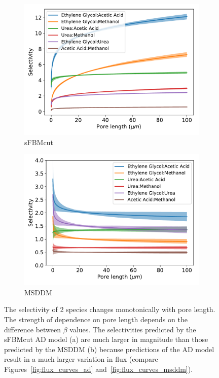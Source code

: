 \documentclass{article}
\begin{document}
  \begin{figure}
  \centering
  \begin{subfigure}{0.45\textwidth}
  \includegraphics[width=\textwidth]{selectivity.pdf}
  \caption{sFBMcut}
  \end{subfigure}
  \begin{subfigure}{0.45\textwidth}
  \includegraphics[width=\textwidth]{selectivity_msddm.pdf}
  \caption{MSDDM}
  \end{subfigure}
  \caption{The selectivity of 2 species changes monotonically with pore length. The
  strength of dependence on pore length depends on the difference between $\beta$ values.
  The selectivities predicted by the sFBMcut AD model (a) are much larger in magnitude than
  those predicted by the MSDDM (b) because predictions of the AD model result in a much
  larger variation in flux (compare Figures~\ref{fig:flux_curves_ad} and~\ref{fig:flux_curves_msddm}).}
  \label{fig:selectivity}
  \end{figure}
  
\end{document}
